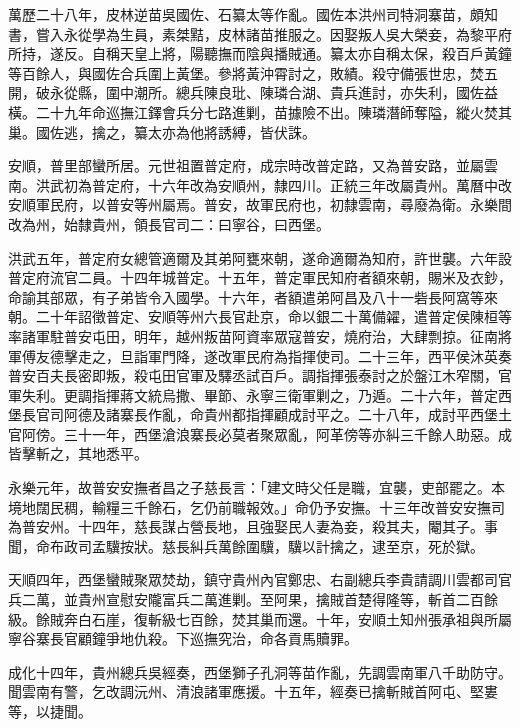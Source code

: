 \begin{pinyinscope}
萬歷二十八年，皮林逆苗吳國佐、石纂太等作亂。國佐本洪州司特洞寨苗，頗知書，嘗入永從學為生員，素桀黠，皮林諸苗推服之。因娶叛人吳大榮妾，為黎平府所持，遂反。自稱天皇上將，陽聽撫而陰與播賊通。纂太亦自稱太保，殺百戶黃鐘等百餘人，與國佐合兵圍上黃堡。參將黃沖霄討之，敗績。殺守備張世忠，焚五開，破永從縣，圍中潮所。總兵陳良玭、陳璘合湖、貴兵進討，亦失利，國佐益橫。二十九年命巡撫江鐸會兵分七路進剿，苗據險不出。陳璘潛師奪隘，縱火焚其巢。國佐逃，擒之，纂太亦為他將誘縛，皆伏誅。

安順，普里部蠻所居。元世祖置普定府，成宗時改普定路，又為普安路，並屬雲南。洪武初為普定府，十六年改為安順州，隸四川。正統三年改屬貴州。萬曆中改安順軍民府，以普安等州屬焉。普安，故軍民府也，初隸雲南，尋廢為衛。永樂間改為州，始隸貴州，領長官司二：曰寧谷，曰西堡。

洪武五年，普定府女總管適爾及其弟阿甕來朝，遂命適爾為知府，許世襲。六年設普定府流官二員。十四年城普定。十五年，普定軍民知府者額來朝，賜米及衣鈔，命諭其部眾，有子弟皆令入國學。十六年，者額遣弟阿昌及八十一砦長阿窩等來朝。二十年詔徵普定、安順等州六長官赴京，命以銀二十萬備糴，遣普定侯陳桓等率諸軍駐普安屯田，明年，越州叛苗阿資率眾寇普安，燒府治，大肆剽掠。征南將軍傅友德擊走之，旦詣軍門降，遂改軍民府為指揮使司。二十三年，西平侯沐英奏普安百夫長密即叛，殺屯田官軍及驛丞試百戶。調指揮張泰討之於盤江木窄關，官軍失利。更調指揮蔣文統烏撒、畢節、永寧三衛軍剿之，乃遁。二十六年，普定西堡長官司阿德及諸寨長作亂，命貴州都指揮顧成討平之。二十八年，成討平西堡土官阿傍。三十一年，西堡滄浪寨長必莫者聚眾亂，阿革傍等亦糾三千餘人助惡。成皆擊斬之，其地悉平。

永樂元年，故普安安撫者昌之子慈長言：「建文時父任是職，宜襲，吏部罷之。本境地闊民稠，輸糧三千餘石，乞仍前職報效。」命仍予安撫。十三年改普安安撫司為普安州。十四年，慈長謀占營長地，且強娶民人妻為妾，殺其夫，閹其子。事聞，命布政司孟驥按狀。慈長糾兵萬餘圍驥，驥以計擒之，逮至京，死於獄。

天順四年，西堡蠻賊聚眾焚劫，鎮守貴州內官鄭忠、右副總兵李貴請調川雲都司官兵二萬，並貴州宣慰安隴富兵二萬進剿。至阿果，擒賊首楚得隆等，斬首二百餘級。餘賊奔白石崖，復斬級七百餘，焚其巢而還。十年，安順土知州張承祖與所屬寧谷寨長官顧鐘爭地仇殺。下巡撫究治，命各貢馬贖罪。

成化十四年，貴州總兵吳經奏，西堡獅子孔洞等苗作亂，先調雲南軍八千助防守。聞雲南有警，乞改調沅州、清浪諸軍應援。十五年，經奏已擒斬賊首阿屯、堅婁等，以捷聞。


\end{pinyinscope}
